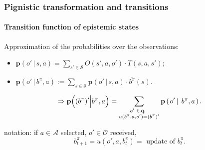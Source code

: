\documentclass[12pt,svgnames,table]{beamer}
\newcommand{\paren}[1]{\left( \left. #1 \right. \right)}
\newcommand{\sachant}{\, \right| \left. \,}
\begin{document}
\begin{frame}
\frametitle{Pignistic transformation and transitions}
\framesubtitle{\footnotesize Transition function of epistemic states}
Approximation of the probabilities over the observations:
\begin{itemize}
\item $\textbf{p} \paren{ o' \sachant s,a } = \sum_{s' \in \mathcal{S}} O(s',a,o') \cdot T(s,a,s');$
\item { \color{red} $ \displaystyle \textbf{p}\paren{o'\sachant b^{\pi},a} := \sum_{s\in\mathcal{S}}\textbf{p}\paren{o' \sachant s,a}\cdot\overline{b^{\pi}}(s)$.}
\end{itemize}
\begin{block}{}
\[ \Rightarrow \textbf{p} \Big( (b^{\pi})' \Big\vert b^{\pi},a \Big) = \sum_{ \substack{ o' \mbox{ \footnotesize t.q. } \\ u(b^{\pi},a,o')=(b^{\pi})'} }\textbf{p}\paren{o'\sachant b^{\pi},a}.\]
\end{block}
\vspace{0.5cm}
notation: if $a \in \mathcal{A}$ selected, $o' \in \mathcal{O}$ received,\\ 
\[ b^{\pi}_{t+1} = u \paren{o',a,b^{\pi}_t} = \mbox{ update of } b^{\pi}_t. \]
\end{frame}
\end{document}
